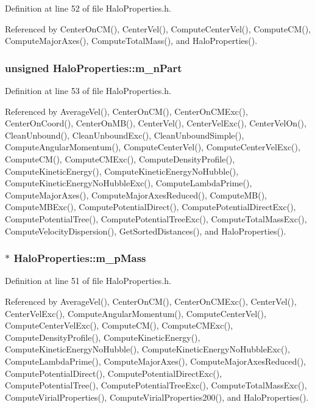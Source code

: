 Definition at line 52 of file HaloProperties.h.



Referenced by CenterOnCM(), CenterVel(), ComputeCenterVel(), ComputeCM(), ComputeMajorAxes(), ComputeTotalMass(), and HaloProperties().

\subsubsection[{m\_\-nPart}]{\setlength{\rightskip}{0pt plus 5cm}unsigned {\bf HaloProperties::m\_\-nPart}}\label{classHaloProperties_afffcd47e8ef37f5e1fb5a395e1fdd6ca}


Definition at line 53 of file HaloProperties.h.



Referenced by AverageVel(), CenterOnCM(), CenterOnCMExc(), CenterOnCoord(), CenterOnMB(), CenterVel(), CenterVelExc(), CenterVelOn(), CleanUnbound(), CleanUnboundExc(), CleanUnboundSimple(), ComputeAngularMomentum(), ComputeCenterVel(), ComputeCenterVelExc(), ComputeCM(), ComputeCMExc(), ComputeDensityProfile(), ComputeKineticEnergy(), ComputeKineticEnergyNoHubble(), ComputeKineticEnergyNoHubbleExc(), ComputeLambdaPrime(), ComputeMajorAxes(), ComputeMajorAxesReduced(), ComputeMB(), ComputeMBExc(), ComputePotentialDirect(), ComputePotentialDirectExc(), ComputePotentialTree(), ComputePotentialTreeExc(), ComputeTotalMassExc(), ComputeVelocityDispersion(), GetSortedDistances(), and HaloProperties().

\subsubsection[{m\_\-pMass}]{ $\ast$ {\bf HaloProperties::m\_\-pMass}}\label{classHaloProperties_ac03a9f5783b159c09a1cdadf847d2444}


Definition at line 51 of file HaloProperties.h.



Referenced by AverageVel(), CenterOnCM(), CenterOnCMExc(), CenterVel(), CenterVelExc(), ComputeAngularMomentum(), ComputeCenterVel(), ComputeCenterVelExc(), ComputeCM(), ComputeCMExc(), ComputeDensityProfile(), ComputeKineticEnergy(), ComputeKineticEnergyNoHubble(), ComputeKineticEnergyNoHubbleExc(), ComputeLambdaPrime(), ComputeMajorAxes(), ComputeMajorAxesReduced(), ComputePotentialDirect(), ComputePotentialDirectExc(), ComputePotentialTree(), ComputePotentialTreeExc(), ComputeTotalMassExc(), ComputeVirialProperties(), ComputeVirialProperties200(), and HaloProperties().

